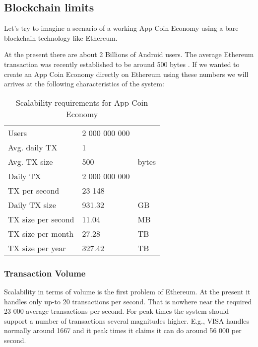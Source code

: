 \subsection{Blockchain limits}

Let's try to imagine a scenario of a working App Coin Economy using a bare blockchain technology like Ethereum.

At the present there are about 2 Billions of Android users. The average Ethereum transaction was recently established to be around 500 bytes \cite{eth_tx_size}. If we wanted to create an App Coin Economy directly on Ethereum using these numbers we will arrives at the following characteristics of the system:

\begin{table}[h]
\centering
\begin{tabular}{|l|l|l}
\cline{1-2}
Users              & 2 000 000 000 &                            \\ \cline{1-2}
Avg. daily TX      & 1             &                            \\ \hline
Avg. TX size       & 500           & \multicolumn{1}{l|}{bytes} \\ \hline
Daily TX           & 2 000 000 000 &                            \\ \cline{1-2}
TX per second      & 23 148        &                            \\ \hline
Daily TX size      & 931.32        & \multicolumn{1}{l|}{GB}    \\ \hline
TX size per second & 11.04         & \multicolumn{1}{l|}{MB}    \\ \hline
TX size per month  & 27.28         & \multicolumn{1}{l|}{TB}    \\ \hline
TX size per year   & 327.42        & \multicolumn{1}{l|}{TB}    \\ \hline
\end{tabular}
\caption{Scalability requirements for App Coin Economy}
\end{table}

\subsubsection{Transaction Volume}
Scalability in terms of volume is the first problem of Ethereum. At the present it handles only up-to 20 transactions per second\cite{eth_scaling}. That is nowhere near the required 23 000 average transactions per second. For peak times the system should support a number of transactions several magnitudes higher. E.g., VISA handles normally around 1667 and it peak times it claims it can do around 56 000 per second\cite{eth_scaling}.

